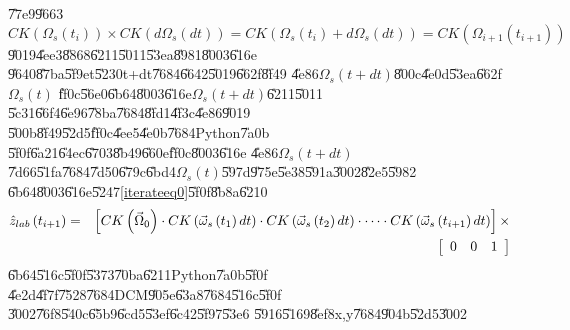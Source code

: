 \U{77e9}\U{9663}%
\begin{equation}
CK(\Omega _{s}(t_{i}))\times CK(d\Omega _{s}(dt))=CK(\Omega
_{s}(t_{i})+d\Omega _{s}(dt))=CK(\Omega _{i+1}(t_{i+1}))
\end{equation}%
\U{9019}\U{4ee3}\U{8868}\U{6211}\U{5011}\U{53ea}\U{8981}\U{8003}\U{616e}%
\U{9640}\U{87ba}\U{5f9e}t\U{5230}t+dt\U{7684}\U{6642}\U{5019}\U{662f}\U{8f49}%
\U{4e86}$\Omega _{s}(t+dt)$\U{800c}\U{4e0d}\U{53ea}\U{662f}$\Omega _{s}(t)$%
\U{ff0c}\U{56e0}\U{6b64}\U{8003}\U{616e}$\Omega _{s}(t+dt)$\U{6211}\U{5011}%
\U{5c31}\U{66f4}\U{6e96}\U{78ba}\U{7684}\U{8fd1}\U{4f3c}\U{4e86}\U{9019}%
\U{500b}\U{8f49}\U{52d5}\U{ff0c}\U{4ee5}\U{4e0b}\U{7684}Python\U{7a0b}%
\U{5f0f}\U{6a21}\U{64ec}\U{6703}\U{8b49}\U{660e}\U{ff0c}\U{8003}\U{616e}%
\U{4e86}$\Omega _{s}(t+dt)$\U{7d66}\U{51fa}\U{7684}\U{7d50}\U{679c}\U{6bd4}$%
\Omega _{s}(t)$\U{597d}\U{975e}\U{5e38}\U{591a}\U{3002}\U{82e5}\U{5982}%
\U{6b64}\U{8003}\U{616e}\U{5247}\ref{iterateeq0}\U{5f0f}\U{8b8a}\U{6210}%
\begin{eqnarray}
\hat{z}_{lab}\left( t_{i+1}\right) &=&\left[ CK\left( \vec{\Omega}%
_{0}\right) \cdot CK\left( \vec{\omega}_{s}\left( t_{1}\right) dt\right)
\cdot CK\left( \vec{\omega}_{s}\left( t_{2}\right) dt\right) \cdot \cdots
\cdot CK\left( \vec{\omega}_{s}\left( t_{i+1}\right) dt\right) \right] \times
\notag \\
&&\left[ 
\begin{array}{ccc}
0 & 0 & 1%
\end{array}%
\right]  \label{iterationCK}
\end{eqnarray}%
\U{6b64}\U{516c}\U{5f0f}\U{5373}\U{70ba}\U{6211}Python\U{7a0b}\U{5f0f}%
\U{4e2d}\U{4f7f}\U{7528}\U{7684}DCM\U{905e}\U{63a8}\U{7684}\U{516c}\U{5f0f}%
\U{3002}\U{76f8}\U{540c}\U{65b9}\U{6cd5}\U{53ef}\U{6c42}\U{5f97}\U{53e6}%
\U{5916}\U{5169}\U{8ef8}x,y\U{7684}\U{904b}\U{52d5}\U{3002}

\bigskip

